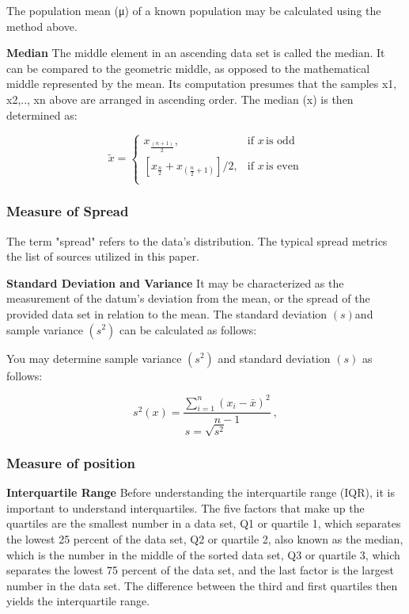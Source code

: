 \documentclass[12 pt]{scrartcl}
\begin{document}
The population mean (μ) of a known population may be calculated using the method above.\citep{R}

\textbf{Median} The middle element in an ascending data set is called the median. It can be compared to the geometric middle, as opposed to the mathematical middle represented by the mean. Its computation presumes that the samples x1, x2,.., xn above are arranged in ascending order. The median (x) is then determined as:

\[
    \tilde{x} = 
\begin{cases}
    x_\frac{(n+1)}{2},& \text{if } x\, \text{is odd}\\
	[{x_\frac{n}{2} + x_{(\frac{n}{2}+1)}}]/{2}, & \text{if } x\,\text{is even}\\
\end{cases}
\]
\citep{R}
\subsubsection{Measure of Spread}

The term "spread" refers to the data's distribution. The typical spread metrics the list of sources utilized in this paper.

\textbf{Standard Deviation and Variance} It may be characterized as the measurement of the datum's deviation from the mean, or the spread of the provided data set in relation to the mean. The standard deviation $(s)$and sample variance $(s^2)$ can be calculated as follows:

You may determine sample variance $(s^2)$ and standard deviation $(s)$ as follows:

\[ s^2(x) = \frac{{\sum_{i=1}^n ({x_i - \bar{x}})^2}}{{n-1}}\:,\]
\[s=\sqrt{s^2}\]
\citep{R}
\subsubsection{Measure of position}
\textbf{Interquartile Range} Before understanding the interquartile range (IQR), it is important to understand interquartiles. The five factors that make up the quartiles are the smallest number in a data set, Q1 or quartile 1, which separates the lowest 25 percent of the data set, Q2 or quartile 2, also known as the median, which is the number in the middle of the sorted data set, Q3 or quartile 3, which separates the lowest 75 percent of the data set, and the last factor is the largest number in the data set. The difference between the third and first quartiles then yields the interquartile range.\citep{R}
\end{document}
